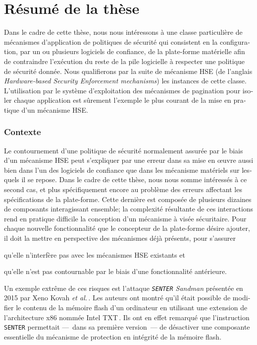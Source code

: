 \chapter{Résumé de la thèse}

\begin{otherlanguage}{french}
  Dans le cadre de cette thèse, nous nous intéressons à une classe particulière
  de mécanismes d’application de politiques de sécurité qui consistent en la
  configuration, par un ou plusieurs logiciels de confiance, de la plate-forme
  matérielle afin de contraindre l’exécution du reste de la pile logicielle à
  respecter une politique de sécurité donnée.
  Nous qualifierons par la suite de mécanisme HSE (de l’anglais
  \emph{Hardware-based Security Enforcement mechanisms}) les instances de cette
  classe.
  L’utilisation par le système d’exploitation des mécanismes de pagination pour
  isoler chaque application est sûrement l’exemple le plus courant de la mise en
  pratique d’un mécanisme HSE.

  \subsection*{Contexte}

  Le contournement d’une politique de sécurité normalement assurée par le biais
  d’un mécanisme HSE peut s’expliquer par une erreur dans sa mise en œuvre aussi
  bien dans l’un des logiciels de confiance que dans les mécanisme matériels sur
  lesquels il se repose.
  Dans le cadre de cette thèse, nous nous somme intéressés à ce second cas, et
  plus spécifiquement encore au problème des erreurs affectant les
  spécifications de la plate-forme.
  Cette dernière est composée de plusieurs dizaines de composants interagissant
  ensemble; la complexité résultante de ces interactions rend en pratique
  difficile la conception d’un mécanisme à visée sécuritaire.
  Pour chaque nouvelle fonctionnalité que le concepteur de la plate-forme désire
  ajouter, il doit la mettre en perspective des mécanismes déjà présents, pour
  s’assurer
  \begin{inparaenum}[(1)]
  \item qu’elle n’interfère pas avec les mécanismes HSE existants et
  \item qu’elle n’est pas contournable par le biais d’une fonctionnalité
    antérieure.
  \end{inparaenum}
  Un exemple extrême de ces risques est l’attaque \emph{\texttt{SENTER} Sandman}
  présentée en 2015 par Xeno Kovah \emph{et al.}\,\cite{kovah2015senter}.
  Les auteurs ont montré qu’il était possible de modifier le contenu de la
  mémoire flash d’un ordinateur en utilisant une extension de l’architecture x86
  nommée Intel TXT\,\cite{intel2015txt}.
  Ils ont en effet remarqué que l’instruction \texttt{SENTER} permettait
  ---~dans sa première version~--- de désactiver une composante essentielle du
  mécanisme de protection en intégrité de la mémoire flash.


\end{otherlanguage}
